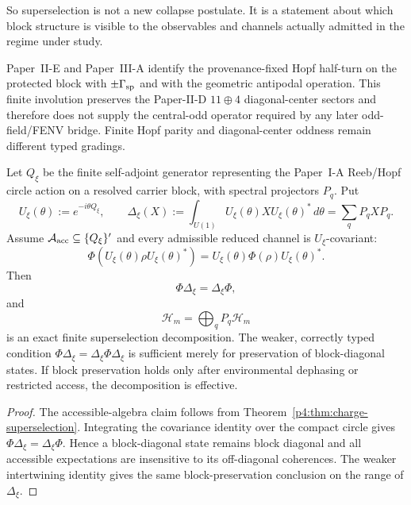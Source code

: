 \documentclass[12pt,a4paper]{article}
\begin{document}
So superselection is not a new collapse postulate.
It is a statement about which block structure is visible to the observables and channels actually admitted in the regime under study.


\begin{remark}
\label{p4:rem:hopf-half-turn-not-central-odd}
Paper~II-E and Paper~III-A identify the provenance-fixed Hopf half-turn on
the protected block with \(\pm\Gamma_{\rm sp}\) and with the geometric
antipodal operation.  This finite involution preserves the Paper-II-D
\(11\oplus4\) diagonal-center sectors and therefore does not supply the
central-odd operator required by any later odd-field/FENV bridge.  Finite
Hopf parity and diagonal-center oddness remain different typed gradings.
\end{remark}

\begin{corollary}
\label{p4:cor:hopf-reeb-superselection}
Let \(Q_\xi\) be the finite self-adjoint generator representing the Paper~I-A
Reeb/Hopf circle action on a resolved carrier block, with spectral projectors
\(P_q\).  Put
\[
U_\xi(\theta):=e^{-i\theta Q_\xi},
\qquad
\Delta_\xi(X):=
\int_{U(1)}U_\xi(\theta)XU_\xi(\theta)^*\,d\theta
=\sum_qP_qXP_q .
\]
Assume
\(\mathcal A_{\rm acc}\subseteq\{Q_\xi\}'\) and every admissible reduced
channel is \(U_\xi\)-covariant:
\[
\Phi\!\left(U_\xi(\theta)\rho U_\xi(\theta)^*\right)
=
U_\xi(\theta)\Phi(\rho)U_\xi(\theta)^* .
\]
Then
\[
\Phi\Delta_\xi=\Delta_\xi\Phi,
\]
and
\[
\mathcal H_m=\bigoplus_q P_q\mathcal H_m
\]
is an exact finite superselection decomposition.  The weaker, correctly typed
condition
\(\Phi\Delta_\xi=\Delta_\xi\Phi\Delta_\xi\) is sufficient merely for
preservation of block-diagonal states.  If block preservation holds only
after environmental dephasing or restricted access, the decomposition is
effective.
\end{corollary}


\begin{proof}
The accessible-algebra claim follows from
Theorem~\ref{p4:thm:charge-superselection}.  Integrating the covariance
identity over the compact circle gives
\(\Phi\Delta_\xi=\Delta_\xi\Phi\).  Hence a block-diagonal state remains
block diagonal and all accessible expectations are insensitive to its
off-diagonal coherences.  The weaker intertwining identity gives the same
block-preservation conclusion on the range of \(\Delta_\xi\).
\end{proof}
\end{document}
